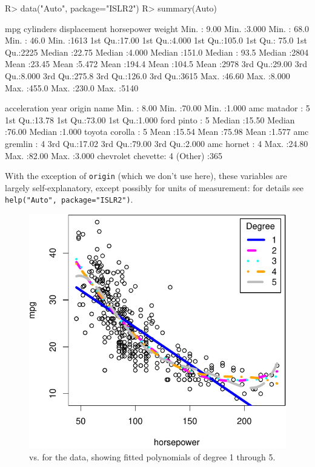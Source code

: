 \documentclass[
]{jss}
\begin{document}
\begin{CodeChunk}
\begin{CodeInput}
R> data("Auto", package="ISLR2")
R> summary(Auto)
\end{CodeInput}
\begin{CodeOutput}
      mpg          cylinders      displacement     horsepower        weight    
 Min.   : 9.00   Min.   :3.000   Min.   : 68.0   Min.   : 46.0   Min.   :1613  
 1st Qu.:17.00   1st Qu.:4.000   1st Qu.:105.0   1st Qu.: 75.0   1st Qu.:2225  
 Median :22.75   Median :4.000   Median :151.0   Median : 93.5   Median :2804  
 Mean   :23.45   Mean   :5.472   Mean   :194.4   Mean   :104.5   Mean   :2978  
 3rd Qu.:29.00   3rd Qu.:8.000   3rd Qu.:275.8   3rd Qu.:126.0   3rd Qu.:3615  
 Max.   :46.60   Max.   :8.000   Max.   :455.0   Max.   :230.0   Max.   :5140  
                                                                               
  acceleration        year           origin                      name    
 Min.   : 8.00   Min.   :70.00   Min.   :1.000   amc matador       :  5  
 1st Qu.:13.78   1st Qu.:73.00   1st Qu.:1.000   ford pinto        :  5  
 Median :15.50   Median :76.00   Median :1.000   toyota corolla    :  5  
 Mean   :15.54   Mean   :75.98   Mean   :1.577   amc gremlin       :  4  
 3rd Qu.:17.02   3rd Qu.:79.00   3rd Qu.:2.000   amc hornet        :  4  
 Max.   :24.80   Max.   :82.00   Max.   :3.000   chevrolet chevette:  4  
                                                 (Other)           :365  
\end{CodeOutput}
\end{CodeChunk}

With the exception of \texttt{origin} (which we don't use here), these
variables are largely self-explanatory, except possibly for units of
measurement: for details see \texttt{help("Auto",\ package="ISLR2")}.

\begin{CodeChunk}
\begin{figure}

{\centering \includegraphics[width=0.5\linewidth]{JSS-article-3_files/figure-latex/mpg-horsepower-scatterplot-polynomials-1} 

}

\caption{ vs.  for the  data, showing fitted polynomials of degree 1 through 5.}\label{fig:mpg-horsepower-scatterplot-polynomials}
\end{figure}
\end{CodeChunk}
\end{document}
